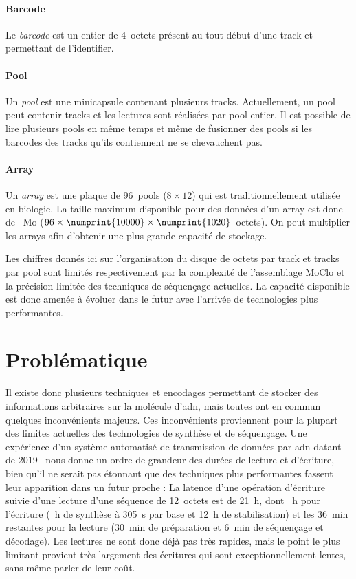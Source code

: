 \documentclass[a4paper]{report}
\begin{document}
\paragraph{Barcode} Le \emph{barcode} est un entier de 4~octets présent au tout début d'une track et permettant de l'identifier.

\paragraph{Pool} Un \emph{pool} est une minicapsule contenant plusieurs tracks.
Actuellement, un pool peut contenir  tracks et les lectures sont réalisées par pool entier.
Il est possible de lire plusieurs pools en même temps
et même de fusionner des pools si les barcodes des tracks qu'ils contiennent ne se chevauchent pas.

\paragraph{Array} Un \emph{array} est une plaque de 96~pools ($8\times12$) qui est traditionnellement utilisée en biologie.
La taille maximum disponible pour des données d’un array est donc de ~Mo ($96\times\numprint{10000}\times\numprint{1020}$~octets).
On peut multiplier les arrays afin d'obtenir une plus grande capacité de stockage.

Les chiffres donnés ici sur l’organisation du disque de  octets par track
et  tracks par pool sont limités respectivement par la complexité de l'assemblage MoClo
et la précision limitée des techniques de séquençage actuelles.
La capacité disponible est donc amenée à évoluer dans le futur avec l'arrivée de technologies plus performantes.

\section{Problématique}

Il existe donc plusieurs techniques et encodages permettant
de stocker des informations arbitraires sur la molécule d'\ac{adn},
mais toutes ont en commun quelques inconvénients majeurs.
Ces inconvénients proviennent pour la plupart des limites actuelles
des technologies de synthèse et de séquençage.
Une expérience d'un système automatisé de transmission de données par \ac{adn} datant de 2019~\cite{takahashi2019demonstration}
nous donne un ordre de grandeur des durées de lecture et d'écriture,
bien qu'il ne serait pas étonnant que des techniques plus performantes fassent leur apparition dans un futur proche :
La latence d'une opération d'écriture suivie d'une lecture d'une séquence de 12~octets est de 21~h,
dont ~h pour l'écriture (~h de synthèse à 305~s par base et 12~h de stabilisation)
et les 36~min restantes pour la lecture (30~min de préparation et 6~min de séquençage et décodage).
Les lectures ne sont donc déjà pas très rapides,
mais le point le plus limitant provient très largement des écritures
qui sont exceptionnellement lentes, sans même parler de leur coût.
\end{document}
